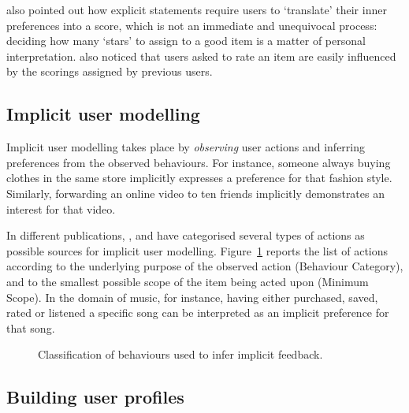  \citet{Potter08} also pointed out how explicit statements require users to `translate' their inner preferences into a score, which is not an immediate and unequivocal process: deciding how many `stars' to assign to a good item is a matter of personal interpretation.
\citet{Banerjee92} also noticed that users asked to rate an item are easily influenced by the scorings assigned by previous users. %


\subsection{Implicit user modelling} %
\label{sub:implicit_models}

Implicit user modelling %
takes place by \emph{observing} user actions and inferring preferences from the observed behaviours.
For instance, someone always buying clothes in the same store implicitly expresses a preference for that fashion style. 
Similarly, forwarding an online video to ten friends implicitly demonstrates an interest for that video. %

In different publications, \citet{Nichols97}, \citet{Oard01} and \citet{Kelly03} have categorised several types of actions as possible sources for implicit user modelling.
Figure~\ref{fig:implicit-feedbacks} reports the list of actions according to the underlying purpose of the observed action (Behaviour Category), and to the smallest possible scope of the item being acted upon (Minimum Scope).
In the domain of music, for instance, having either purchased, saved, rated or listened a specific song can be interpreted as an implicit preference for that song.

\begin{figure}[bthp]
\centering \setlength{\abovecaptionskip}{3pt}
\caption{Classification of behaviours used to infer implicit feedback.}
\label{fig:implicit-feedbacks}
\end{figure}


\subsection{Building user profiles} %
\label{sub:building_user_profiles}

